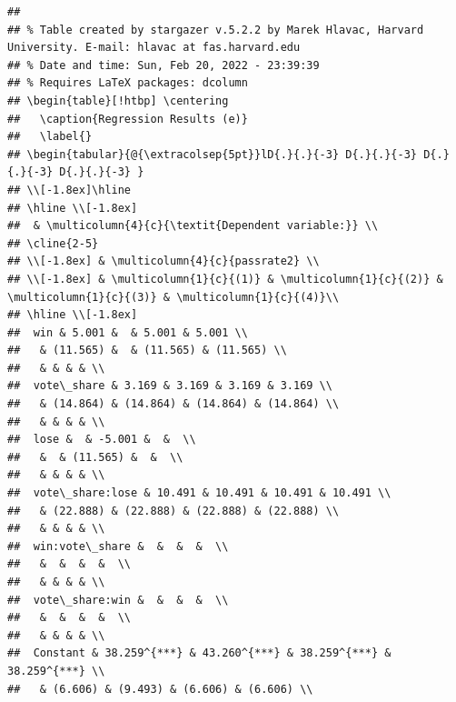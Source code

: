 \documentclass[
  12pt,
  landscape]{article}
\begin{document}
\begin{verbatim}
## 
## % Table created by stargazer v.5.2.2 by Marek Hlavac, Harvard University. E-mail: hlavac at fas.harvard.edu
## % Date and time: Sun, Feb 20, 2022 - 23:39:39
## % Requires LaTeX packages: dcolumn 
## \begin{table}[!htbp] \centering 
##   \caption{Regression Results (e)} 
##   \label{} 
## \begin{tabular}{@{\extracolsep{5pt}}lD{.}{.}{-3} D{.}{.}{-3} D{.}{.}{-3} D{.}{.}{-3} } 
## \\[-1.8ex]\hline 
## \hline \\[-1.8ex] 
##  & \multicolumn{4}{c}{\textit{Dependent variable:}} \\ 
## \cline{2-5} 
## \\[-1.8ex] & \multicolumn{4}{c}{passrate2} \\ 
## \\[-1.8ex] & \multicolumn{1}{c}{(1)} & \multicolumn{1}{c}{(2)} & \multicolumn{1}{c}{(3)} & \multicolumn{1}{c}{(4)}\\ 
## \hline \\[-1.8ex] 
##  win & 5.001 &  & 5.001 & 5.001 \\ 
##   & (11.565) &  & (11.565) & (11.565) \\ 
##   & & & & \\ 
##  vote\_share & 3.169 & 3.169 & 3.169 & 3.169 \\ 
##   & (14.864) & (14.864) & (14.864) & (14.864) \\ 
##   & & & & \\ 
##  lose &  & -5.001 &  &  \\ 
##   &  & (11.565) &  &  \\ 
##   & & & & \\ 
##  vote\_share:lose & 10.491 & 10.491 & 10.491 & 10.491 \\ 
##   & (22.888) & (22.888) & (22.888) & (22.888) \\ 
##   & & & & \\ 
##  win:vote\_share &  &  &  &  \\ 
##   &  &  &  &  \\ 
##   & & & & \\ 
##  vote\_share:win &  &  &  &  \\ 
##   &  &  &  &  \\ 
##   & & & & \\ 
##  Constant & 38.259^{***} & 43.260^{***} & 38.259^{***} & 38.259^{***} \\ 
##   & (6.606) & (9.493) & (6.606) & (6.606) \\ 

\end{verbatim}
\end{document}
